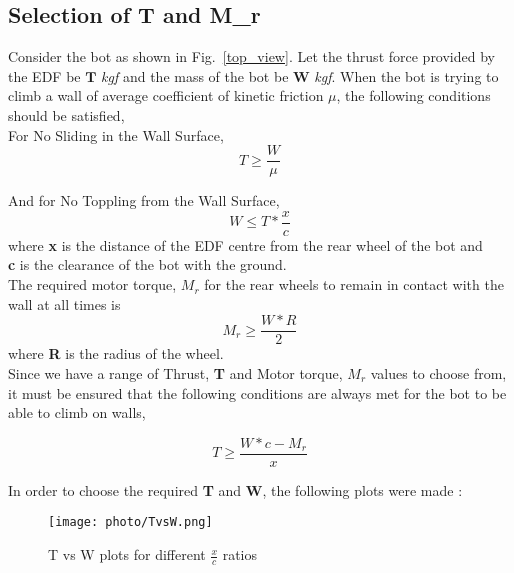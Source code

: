 \subsection {Selection of \textbf{T} and \textbf{M_{r}}} 

Consider the bot as shown in Fig.~\ref{top_view}. Let the thrust force provided by the EDF be $\textbf{T}$ \textit{kgf} and the mass of the bot be $\textbf{W}$ \textit{kgf}. When the bot is trying to climb a wall of average coefficient of kinetic friction $\mu$, the following conditions should be satisfied,\\
For No Sliding in the Wall Surface,
\begin{equation}\label{no_sliding}
T \geq \frac{W}{\mu}
\end{equation}

And for No Toppling from the Wall Surface,
\begin{equation}\label{no_toppling}
W \leq T * \frac{x}{c}
\end{equation}
where \textbf{x} is the distance of the EDF centre from the rear wheel of the bot and \\
\textbf{c} is the clearance of the bot with the ground.\\

The required motor torque, \textbf{$M_r$} for the rear wheels to remain in contact with the wall at all times is 
\begin{equation}\label{motor_torque}
M_r \geq \frac{W*R}{2}
\end{equation}
where \textbf{R} is the radius of the wheel.\\

Since we have a range of Thrust, \textbf{T} and Motor torque, \textbf{$M_r$} values to choose from, it must be ensured that the following conditions are always met for the bot to be able to climb on walls,

\begin{equation}\label{thrust_check}
T \geq \frac{W*c - M_r}{x}
\end{equation}

In order to choose the required \textbf{T} and \textbf{W}, the following plots were made :

\begin{figure}[h]
  \begin{center}
  \texttt{[image: photo/TvsW.png]}\\
  \caption{T vs W plots for different $\frac{x}{c}$ ratios}\label{TvsW}
  \end{center}
\end{figure}

